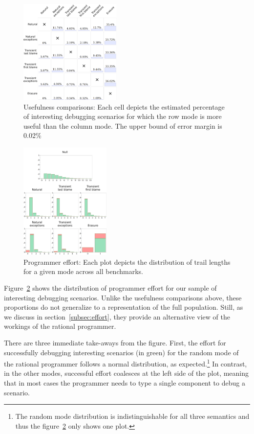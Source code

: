 \begin{figure}
  \centering
  \includegraphics[width=0.45\textwidth]{./plots/avo-matrix}
  \caption{Usefulness comparisons: Each cell depicts the estimated percentage of
  interesting debugging scenarios for which the row mode is more useful
  than the column mode.
  The upper bound of error margin is 0.02\%}
  \label{fig:avo-matrix}
\end{figure}


\begin{figure}
  \centering
  \includegraphics[width=0.4\textwidth]{./plots/bt-lengths-table}
  \caption{Programmer effort: Each plot depicts the distribution of trail
  lengths for a given mode across all benchmarks.}
  \label{fig:effort-table}
\end{figure}


Figure~\ref{fig:effort-table} shows the distribution of programmer effort
for our sample of interesting debugging scenarios. Unlike the usefulness
comparisons above, these proportions do not generalize to a representation of the full population.
Still, as we discuss in section~\ref{subsec:effort}, they provide an
alternative view of the workings of the rational programmer. 

There are
three immediate take-aways from the figure. First, the effort for successfully
debugging interesting scenarios (in green) for the random mode of the
rational programmer follows  a normal distribution, as expected.\footnote{The
random mode distribution is indistinguishable for all three semantics and thus the figure~\ref{fig:effort-table} 
only shows one plot.} In contrast, in the other modes, successful effort coalesces at
the left side of the plot, meaning that in most cases the programmer needs
to type a single component to debug a scenario. 

